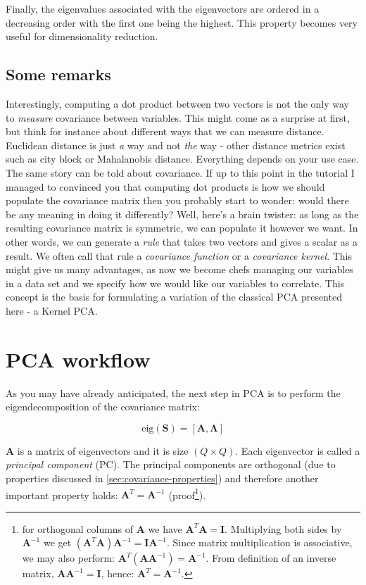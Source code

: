 \documentclass[10pt,twocolumn]{article}
\begin{document}
Finally, the eigenvalues associated with the eigenvectors are ordered in a decreasing order with the first one being the highest. This property becomes very useful for dimensionality reduction.

\subsection{Some remarks}

Interestingly, computing a dot product between two vectors is not the only way to \textit{measure} covariance between variables. This might come as a surprise at first, but think for instance about different ways that we can measure distance. Euclidean distance is just \textit{a} way and not \textit{the} way - other distance metrics exist such as city block or Mahalanobis distance. Everything depends on your use case. The same story can be told about covariance. If up to this point in the tutorial I managed to convinced you that computing dot products is how we should populate the covariance matrix then you probably start to wonder: would there be any meaning in doing it differently? Well, here's a brain twister: as long as the resulting covariance matrix is symmetric, we can populate it however we want. In other words, we can generate a \textit{rule} that takes two vectors and gives a scalar as a result. We often call that rule a \textit{covariance function} or a \textit{covariance kernel}. This might give us many advantages, as now we become chefs managing our variables in a data set and we specify how we would like our variables to correlate. This concept is the basis for formulating a variation of the classical PCA presented here - a Kernel PCA.


\section{PCA workflow}

As you may have already anticipated, the next step in PCA is to perform the eigendecomposition of the covariance matrix:

\begin{equation} \label{eq:eig-dec}
\text{eig}(\bm{S}) = [\bm{A}, \bm{\Lambda}]
\end{equation}



$\bm{A}$ is a matrix of eigenvectors and it is size $(Q \times Q)$. Each eigenvector is called a \textit{principal component} (PC). The principal components are orthogonal (due to properties discussed in \ref{sec:covariance-properties}) and therefore another important property holds: $\bm{A}^T = \bm{A}^{-1}$ (proof\footnote{for orthogonal columns of $\bm{A}$ we have $\bm{A}^T \bm{A} = \bm{I}$. Multiplying both sides by $\bm{A}^{-1}$ we get $(\bm{A}^T \bm{A}) \bm{A}^{-1}= \bm{I}\bm{A}^{-1}$. Since matrix multiplication is associative, we may also perform: $\bm{A}^T (\bm{A} \bm{A}^{-1}) = \bm{A}^{-1}$. From definition of an inverse matrix,  $\bm{A} \bm{A}^{-1} = \bm{I}$, hence: $\bm{A}^T = \bm{A}^{-1}$.}).
\end{document}

